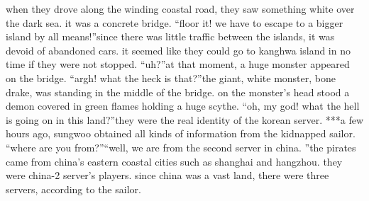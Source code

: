  when they drove along the winding coastal road, they saw something white over the dark sea.
 it was a concrete bridge.
“floor it! we have to escape to a bigger island by all means!”since there was little traffic between the islands, it was devoid of abandoned cars.
it seemed like they could go to kanghwa island in no time if they were not stopped.
“uh?”at that moment, a huge monster appeared on the bridge.
“argh! what the heck is that?”the giant, white monster, bone drake, was standing in the middle of the bridge.
on the monster’s head stood a demon covered in green flames holding a huge scythe.
“oh, my god! what the hell is going on in this land?”they were the real identity of the korean server.
***a few hours ago, sungwoo obtained all kinds of information from the kidnapped sailor.
“where are you from?”“well, we are from the second server in china.
”the pirates came from china’s eastern coastal cities such as shanghai and hangzhou.
 they were china-2 server’s players.
 since china was a vast land, there were three servers, according to the sailor.

